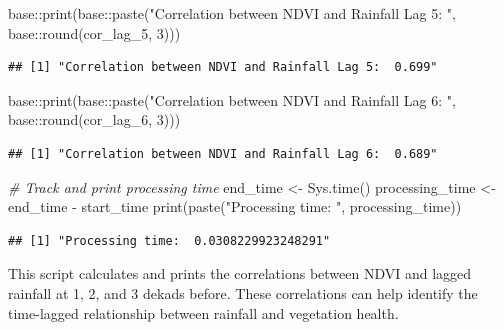 \documentclass[
]{article}
\newenvironment{Shaded}{}{}
\newcommand{\CommentTok}[1]{\textcolor[rgb]{0.38,0.63,0.69}{\textit{#1}}}
\newcommand{\DecValTok}[1]{\textcolor[rgb]{0.25,0.63,0.44}{#1}}
\newcommand{\FunctionTok}[1]{\textcolor[rgb]{0.02,0.16,0.49}{#1}}
\newcommand{\NormalTok}[1]{#1}
\newcommand{\OtherTok}[1]{\textcolor[rgb]{0.00,0.44,0.13}{#1}}
\newcommand{\SpecialCharTok}[1]{\textcolor[rgb]{0.25,0.44,0.63}{#1}}
\newcommand{\StringTok}[1]{\textcolor[rgb]{0.25,0.44,0.63}{#1}}
\begin{document}
\begin{Shaded}
\begin{Highlighting}[]
\NormalTok{base}\SpecialCharTok{::}\FunctionTok{print}\NormalTok{(base}\SpecialCharTok{::}\FunctionTok{paste}\NormalTok{(}\StringTok{"Correlation between NDVI and Rainfall Lag 5: "}\NormalTok{, }
\NormalTok{                        base}\SpecialCharTok{::}\FunctionTok{round}\NormalTok{(cor\_lag\_5, }\DecValTok{3}\NormalTok{)))}
\end{Highlighting}
\end{Shaded}

\begin{verbatim}
## [1] "Correlation between NDVI and Rainfall Lag 5:  0.699"
\end{verbatim}

\begin{Shaded}
\begin{Highlighting}[]
\NormalTok{base}\SpecialCharTok{::}\FunctionTok{print}\NormalTok{(base}\SpecialCharTok{::}\FunctionTok{paste}\NormalTok{(}\StringTok{"Correlation between NDVI and Rainfall Lag 6: "}\NormalTok{, }
\NormalTok{                        base}\SpecialCharTok{::}\FunctionTok{round}\NormalTok{(cor\_lag\_6, }\DecValTok{3}\NormalTok{)))}
\end{Highlighting}
\end{Shaded}

\begin{verbatim}
## [1] "Correlation between NDVI and Rainfall Lag 6:  0.689"
\end{verbatim}

\begin{Shaded}
\begin{Highlighting}[]
\CommentTok{\# Track and print processing time}
\NormalTok{end\_time }\OtherTok{\textless{}{-}} \FunctionTok{Sys.time}\NormalTok{()}
\NormalTok{processing\_time }\OtherTok{\textless{}{-}}\NormalTok{ end\_time }\SpecialCharTok{{-}}\NormalTok{ start\_time}
\FunctionTok{print}\NormalTok{(}\FunctionTok{paste}\NormalTok{(}\StringTok{"Processing time: "}\NormalTok{, processing\_time))}
\end{Highlighting}
\end{Shaded}

\begin{verbatim}
## [1] "Processing time:  0.0308229923248291"
\end{verbatim}

This script calculates and prints the correlations between NDVI and
lagged rainfall at 1, 2, and 3 dekads before. These correlations can
help identify the time-lagged relationship between rainfall and
vegetation health.
\end{document}

